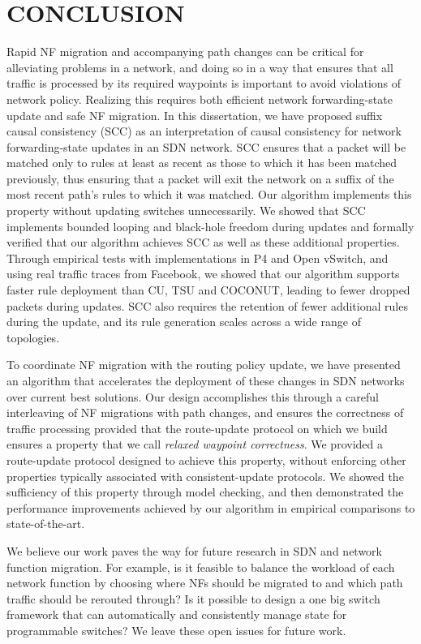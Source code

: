 \chapter{\uppercase{Conclusion}}

Rapid NF migration and accompanying path changes can be critical for
alleviating problems in a network, and doing so in a way that ensures
that all traffic is processed by its required waypoints is important
to avoid violations of network policy. Realizing this requires both efficient network forwarding-state update and safe NF migration. In this dissertation, we have proposed suffix causal consistency (SCC) as an interpretation of causal consistency for network forwarding-state updates in an SDN network.  SCC ensures that a packet will be matched only to rules at least as recent as
those to which it has been matched previously, thus ensuring that a
packet will exit the network on a suffix of the most recent path's
rules to which it was matched.  Our algorithm implements this property
without updating switches unnecessarily.  We showed that SCC
implements bounded looping and black-hole freedom during updates and
formally verified that our algorithm achieves SCC as well as these
additional properties.  Through empirical tests with implementations
in P4 and Open vSwitch, and using real traffic traces from Facebook,
we showed that our algorithm supports faster rule deployment than CU,
TSU and COCONUT, leading to fewer dropped packets during updates.  SCC also requires the retention of fewer additional rules during the update, and its rule generation scales across a wide range of topologies.


To coordinate NF migration with the routing policy update, we have
presented an algorithm that accelerates the deployment of these
changes in SDN networks over current best solutions.  Our design
accomplishes this through a careful interleaving of NF migrations with
path changes, and ensures the correctness of traffic processing provided
that the route-update protocol on which we build ensures a property
that we call \textit{relaxed waypoint correctness}.  We provided a
route-update protocol designed to achieve this property, without
enforcing other properties typically associated with consistent-update
protocols.  We showed the sufficiency of this property through model
checking, and then demonstrated the performance improvements achieved by our algorithm in empirical comparisons to state-of-the-art.

We believe our work paves the way for future research in SDN and network function migration. For example, is it feasible to balance the workload of each network function by choosing where NFs should be migrated to and which path traffic should be rerouted through?  Is it possible to design a one big switch framework that can automatically and consistently manage state for programmable switches? We leave these open issues for future work. 
